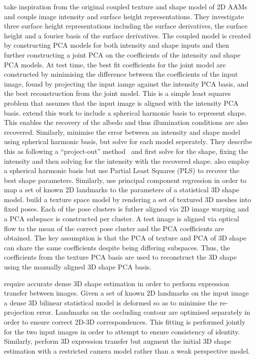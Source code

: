 \citet{castelan2007coupled} take inspiration from the original coupled 
texture and shape model of 2D AAMs~\cite{cootes2001active} and couple image
intensity and surface height representations. They investigate three surface
height representations including the surface derivatives, the surface height
and a fourier basis of the surface derivatives. The coupled model is created
by constructing PCA models for both intensity and shape inputs and then
further constructing a joint PCA on the coefficients of the intensity and shape
PCA models. At test time, the best fit coefficients for the joint model are
constructed by minimising the difference between the coefficients of
the input image, found by projecting the input iamge against the intensity PCA
basis, and the best reconstruction from the joint model. This is a simple
least squares problem that assumes that the input image is aligned
with the intensity PCA basis. \citet{ahmed2007new} extend this work to
include a spherical harmonic basis to represent shape. This enables
the recovery of the albedo and thus illumination conditions are also
recovered. Similarly, \citet{rara2009model} minimise the error between
an intensity and shape model using spherical harmonic basis, but solve for 
each model seperately. They describe this as following a ``project-out'' 
method~\cite{matthews2004active} and first solve for the shape, fixing the 
intensity and then solving for the intensity with the recovered shape. 
\citet{rara2010face} also employ a spherical harmonic basis but use
Partial Least Squares (PLS) to recover the best shape parameters. Similarly,
\citet{rara2011model} use principal component regression in order to map
a set of known 2D landmarks to the parameters of a statistical 3D shape model.
\citet{kouzani1998example} build a texture space model by rendering a set of
textured 3D meshes into fixed poses. Each of the pose clusters is futher aligned
via 2D image warping and a PCA subspace is constructed per cluster. A test image
is aligned via optical flow to the mean of the correct pose cluster and the PCA
coefficients are obtained. The key assumption is that the PCA of texture and PCA
of 3D shape can share the same coefficients despite being differing subspaces.
Thus, the coefficients from the texture PCA basis are used to reconstruct the 3D
shape using the manually aligned 3D shape PCA basis.

\citet{Yang:2011gj} require accurate dense 3D shape estimation in order to
perform expression transfer between images. Given a set of known 2D landmarks on
the input image a dense 3D bilinear statistical model is deformed so as to
minimise the re-projection error. Landmarks on the occluding contour are
optimised separately in order to ensure correct 2D-3D correspondences. This
fitting is performed jointly for the two input images in order to attempt to
ensure consistency of identity.
Similarly, \citet{yang2012face} perform 3D expression transfer
but augment the initial 3D shape estimation with a restricted camera model
rather than a weak perspective model.

